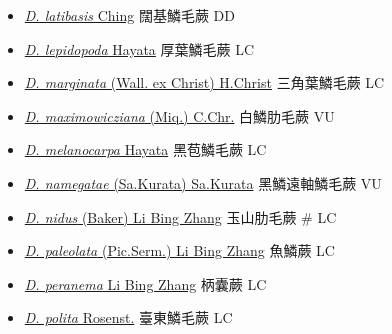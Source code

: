\begin{itemize}
\begin{itemize}
        \item[] \href{http://www.theplantlist.org/tpl1.1/search?q=Dryopteris+latibasis}{\textit{D. latibasis} Ching}   闊基鱗毛蕨   DD
        \item[] \href{http://www.theplantlist.org/tpl1.1/search?q=Dryopteris+lepidopoda}{\textit{D. lepidopoda} Hayata}   厚葉鱗毛蕨   LC
        \item[] \href{http://www.theplantlist.org/tpl1.1/search?q=Dryopteris+marginata}{\textit{D. marginata} (Wall. ex Christ) H.Christ}   三角葉鱗毛蕨   LC
        \item[] \href{http://www.theplantlist.org/tpl1.1/search?q=Dryopteris+maximowicziana}{\textit{D. maximowicziana} (Miq.) C.Chr.}   白鱗肋毛蕨   VU
        \item[] \href{http://www.theplantlist.org/tpl1.1/search?q=Dryopteris+melanocarpa}{\textit{D. melanocarpa} Hayata}   黑苞鱗毛蕨   LC
        \item[] \href{http://www.theplantlist.org/tpl1.1/search?q=Dryopteris+namegatae}{\textit{D. namegatae} (Sa.Kurata) Sa.Kurata}   黑鱗遠軸鱗毛蕨   VU
        \item[] \href{http://www.theplantlist.org/tpl1.1/search?q=Dryopteris+nidus}{\textit{D. nidus} (Baker) Li Bing Zhang}   玉山肋毛蕨  \# LC
        \item[] \href{http://www.theplantlist.org/tpl1.1/search?q=Dryopteris+paleolata}{\textit{D. paleolata} (Pic.Serm.) Li Bing Zhang}   魚鱗蕨   LC
        \item[] \href{http://www.theplantlist.org/tpl1.1/search?q=Dryopteris+peranema}{\textit{D. peranema} Li Bing Zhang}   柄囊蕨   LC
        \item[] \href{http://www.theplantlist.org/tpl1.1/search?q=Dryopteris+polita}{\textit{D. polita} Rosenst.}   臺東鱗毛蕨   LC

\end{itemize}
\end{itemize}
